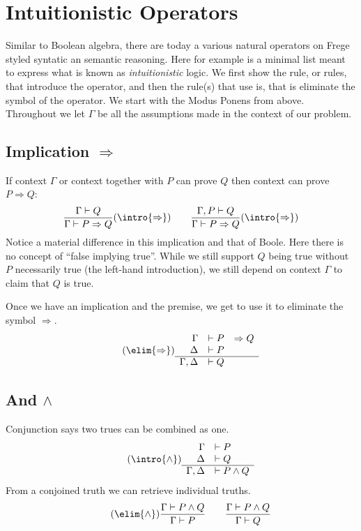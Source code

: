 \section{Intuitionistic Operators}
Similar to Boolean algebra, there are today a various natural operators on Frege styled 
syntatic an semantic reasoning.  Here for example is a minimal list meant to express 
what is known as \emph{intuitionistic} logic.  We first show the rule, or rules, that introduce
the operator, and then the rule(s) that use is, that is eliminate the symbol of the operator.
We start with the Modus Ponens from above.  Throughout we let $\Gamma$ be all the assumptions 
made in the context of our problem.

\subsection{Implication $\Rightarrow$}
If context $\Gamma$ or context together with $P$ can prove $Q$ then context 
can prove $P\Rightarrow Q$:
\begin{align*}
    \frac{\Gamma\vdash Q}{\Gamma\vdash P\Rightarrow Q}(\intro{\Rightarrow})
    \qquad 
    \frac{\Gamma,P\vdash Q}{\Gamma \vdash P\Rightarrow Q}(\intro{\Rightarrow})
\end{align*}
Notice a material difference in this implication and that of Boole.  Here there is 
no concept of ``false implying true''.  While we still support $Q$ being true without 
$P$ necessarily true (the left-hand introduction), we still depend on context $\Gamma$ 
to claim that $Q$ is true.  

Once we have an implication and the premise, we get to use it to eliminate the symbol 
$\Rightarrow$.
\begin{gather}
    \tag{$\elim{\Rightarrow}$}
    \begin{array}{rrl}
       \Gamma &\vdash  P &\Rightarrow Q\\
     \Delta  &\vdash  P\\
    \hline 
      \Gamma,\Delta &\vdash  Q
    \end{array}
\end{gather}

\subsection{And $\wedge$}

Conjunction says two trues can be combined as one.
\begin{align*}
    \tag{$\intro{\wedge}$}
    \begin{array}{rl}
        \Gamma & \vdash P\\
        \Delta & \vdash Q\\
    \hline 
        \Gamma,\Delta & \vdash P\wedge Q
    \end{array}
\end{align*}
From a conjoined truth we can retrieve individual truths.
\begin{align*}
    \tag{$\elim{\wedge}$}
    \frac{\Gamma\vdash P\wedge Q}{\Gamma\vdash P}
    \qquad 
    \frac{\Gamma\vdash P\wedge Q}{\Gamma\vdash Q}
\end{align*}

